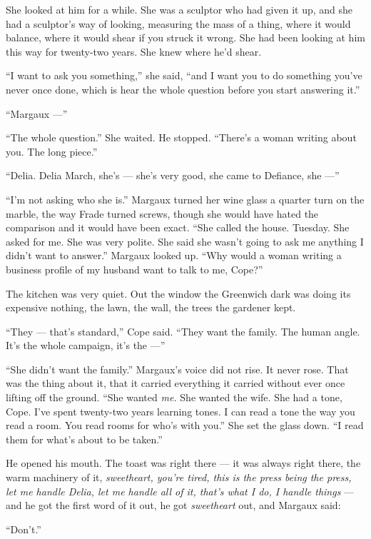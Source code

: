 \documentclass[11pt,openany]{book}
\begin{document}
She looked at him for a while. She was a sculptor who had given it up, and she had a sculptor's way of looking, measuring the mass of a thing, where it would balance, where it would shear if you struck it wrong. She had been looking at him this way for twenty-two years. She knew where he'd shear.

``I want to ask you something,'' she said, ``and I want you to do something you've never once done, which is hear the whole question before you start answering it.''

``Margaux ---''

``The whole question.'' She waited. He stopped. ``There's a woman writing about you. The long piece.''

``Delia. Delia March, she's --- she's very good, she came to Defiance, she ---''

``I'm not asking who she is.'' Margaux turned her wine glass a quarter turn on the marble, the way Frade turned screws, though she would have hated the comparison and it would have been exact. ``She called the house. Tuesday. She asked for me. She was very polite. She said she wasn't going to ask me anything I didn't want to answer.'' Margaux looked up. ``Why would a woman writing a business profile of my husband want to talk to me, Cope?''

The kitchen was very quiet. Out the window the Greenwich dark was doing its expensive nothing, the lawn, the wall, the trees the gardener kept.

``They --- that's standard,'' Cope said. ``They want the family. The human angle. It's the whole campaign, it's the ---''

``She didn't want the family.'' Margaux's voice did not rise. It never rose. That was the thing about it, that it carried everything it carried without ever once lifting off the ground. ``She wanted \textit{me.} She wanted the wife. She had a tone, Cope. I've spent twenty-two years learning tones. I can read a tone the way you read a room. You read rooms for who's with you.'' She set the glass down. ``I read them for what's about to be taken.''

He opened his mouth. The toast was right there --- it was always right there, the warm machinery of it, \textit{sweetheart, you're tired, this is the press being the press, let me handle Delia, let me handle all of it, that's what I do, I handle things} --- and he got the first word of it out, he got \textit{sweetheart} out, and Margaux said:

``Don't.''
\end{document}
